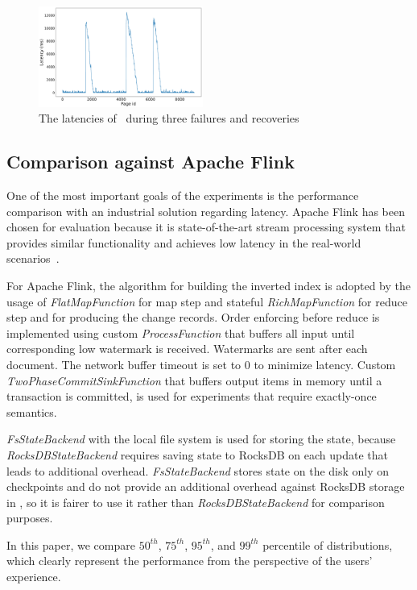 \begin{figure}[htbp]
  \centering
  \includegraphics[width=0.48\textwidth]{pics/blink}
  \caption{The latencies of \FlameStream\ during three failures and recoveries}
  \label {recovery}
\end{figure}

\subsection{Comparison against Apache Flink}
One of the most important goals of the experiments is the performance comparison with an industrial solution regarding latency. Apache Flink has been chosen for evaluation because it is state-of-the-art stream processing system that provides similar functionality and achieves low latency in the real-world scenarios~\cite{S7530084}. 

For Apache Flink, the algorithm for building the inverted index is adopted by the usage of {\it FlatMapFunction} for map step and stateful {\it RichMapFunction} for reduce step and for producing the change records. Order enforcing before reduce is implemented using custom {\it ProcessFunction} that buffers all input until corresponding low watermark is received. Watermarks are sent after each document. The network buffer timeout is set to 0 to minimize latency. Custom {\it TwoPhaseCommitSinkFunction} that buffers output items in memory until a transaction is committed, is used for experiments that require exactly-once semantics. 

{\it FsStateBackend} with the local file system is used for storing the state, because {\it RocksDBStateBackend} requires saving state to RocksDB on each update that leads to additional overhead. {\it FsStateBackend} stores state on the disk only on checkpoints and do not provide an additional overhead against RocksDB storage in \FlameStream, so it is fairer to use it rather than {\it RocksDBStateBackend} for comparison purposes.

In this paper, we compare $50^{th}$, $75^{th}$, $95^{th}$, and $99^{th}$ percentile of distributions, which clearly represent the performance from the perspective of the users' experience.

